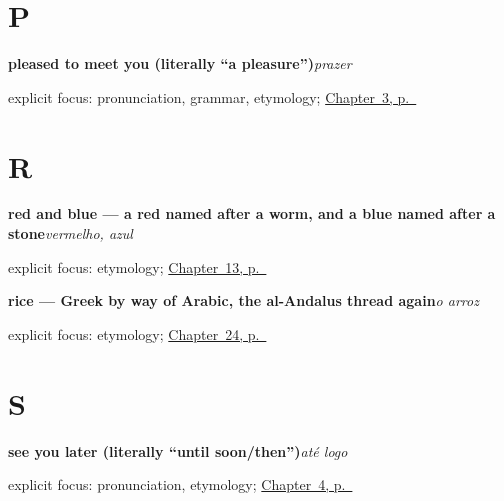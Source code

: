 \section*{P}

\noindent\begin{minipage}[t]{\linewidth}
\raggedright
\textbf{pleased to meet you (literally \textquotedblleft{}a pleasure\textquotedblright{})}\enspace\emph{prazer}\par
\footnotesize explicit focus: pronunciation, grammar, etymology; \hyperref[ch:pt-introductions]{Chapter~3, p.~\pageref*{ch:pt-introductions}}
\end{minipage}\par\smallskip

\section*{R}

\noindent\begin{minipage}[t]{\linewidth}
\raggedright
\textbf{red and blue — a red named after a worm, and a blue named after a stone}\enspace\emph{vermelho, azul}\par
\footnotesize explicit focus: etymology; \hyperref[ch:pt-colours]{Chapter~13, p.~\pageref*{ch:pt-colours}}
\end{minipage}\par\smallskip

\noindent\begin{minipage}[t]{\linewidth}
\raggedright
\textbf{rice — Greek by way of Arabic, the al-Andalus thread again}\enspace\emph{o arroz}\par
\footnotesize explicit focus: etymology; \hyperref[ch:pt-cheese-egg-rice-sugar]{Chapter~24, p.~\pageref*{ch:pt-cheese-egg-rice-sugar}}
\end{minipage}\par\smallskip

\section*{S}

\noindent\begin{minipage}[t]{\linewidth}
\raggedright
\textbf{see you later (literally \textquotedblleft{}until soon/then\textquotedblright{})}\enspace\emph{até logo}\par
\footnotesize explicit focus: pronunciation, etymology; \hyperref[ch:pt-farewells]{Chapter~4, p.~\pageref*{ch:pt-farewells}}
\end{minipage}\par\smallskip

